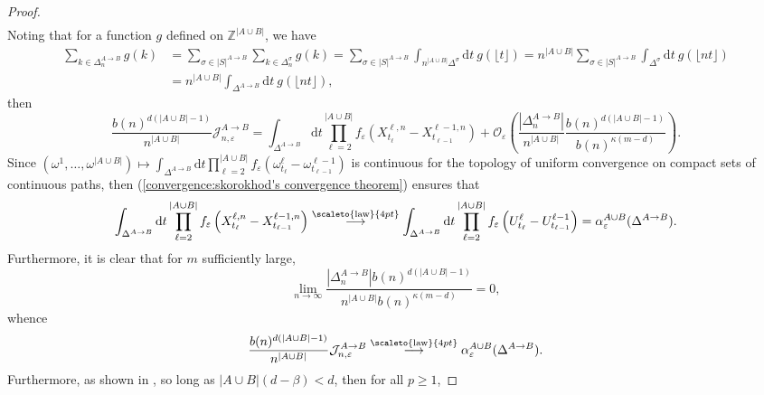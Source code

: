 \documentclass[12pt]{article}
\newcommand{\1}{\mathds{1}}
\newcommand{\ZZ}{\mathbb Z}
\renewcommand{\d}{\mathrm d}
\newcommand{\distribution}{\stackrel{\scaleto{\mathrm{law}}{4pt}}{\longrightarrow}}
\numberwithin{equation}{section}
\begin{document}
\begin{proof}
\begin{align*}
    \end{align*}
    Noting that for a function $g$ defined on $\ZZ^{|A\cup B|}$, we have 
    \begin{align*}
        \sum_{k\in\Delta_n^{A\rightarrow B}}g(k)&=\sum_{\sigma\in|S|^{A\rightarrow B}}\sum_{k\in\Delta_n^\sigma}g(k)=\sum_{\sigma\in|S|^{A\rightarrow B}}\int_{n^{|A\cup B|}\Delta^\sigma}\d t\ g(\lfloor t\rfloor)=n^{|A\cup B|}\sum_{\sigma\in|S|^{A\rightarrow B}}\int_{\Delta^\sigma}\d t\ g(\lfloor nt\rfloor)\\
        &=n^{|A\cup B|}\int_{\Delta^{A\rightarrow B}}\d t\ g(\lfloor nt\rfloor),
    \end{align*}
    then
    \begin{equation*}
        \frac{b(n)^{d(|A\cup B|-1)}}{n^{|A\cup B|}}\mathcal J_{n,\varepsilon}^{A\rightarrow B}=\int_{\Delta^{A\rightarrow B}}\d t\prod_{\ell=2}^{|A\cup B|}f_\varepsilon\left(X_{t_\ell}^{\ell,n}-X_{t_{\ell-1}}^{\ell-1,n}\right)+\mathcal O_\varepsilon\left(\frac{|\Delta_n^{A\rightarrow B}|}{n^{|A\cup B|}}\frac{b(n)^{d(|A\cup B|-1)}}{b(n)^{\kappa(m-d)}}\right).
    \end{equation*}
    Since $(\omega^1,\dots,\omega^{|A\cup B|})\mapsto\int_{\Delta^{A\rightarrow B}}\d t\prod_{\ell=2}^{|A\cup B|}f_\varepsilon\left(\omega_{t_\ell}^\ell-\omega_{t_{\ell-1}}^{\ell-1}\right)$ is continuous for the topology of uniform convergence on compact sets of continuous paths, then (\ref{convergence:skorokhod's convergence theorem}) ensures that 
    \begin{equation*}
        \int_{\Delta^{A\rightarrow B}}\d t\prod_{\ell=2}^{|A\cup B|}f_\varepsilon\left(X_{t_\ell}^{\ell,n}-X_{t_{\ell-1}}^{\ell-1,n}\right)\distribution\int_{\Delta^{A\rightarrow B}}\d t\prod_{\ell=2}^{|A\cup B|}f_\varepsilon\left(U_{t_\ell}^\ell-U_{t_{\ell-1}}^{\ell-1}\right)=\alpha_\varepsilon^{A\cup B}(\Delta^{A\rightarrow B}).
    \end{equation*}
    Furthermore, it is clear that for $m$ sufficiently large, 
    \begin{equation*}
        \underset{n\rightarrow \infty}\lim\frac{|\Delta_n^{A\rightarrow B}|b(n)^{d(|A\cup B|-1)}}{n^{|A\cup B|}b(n)^{\kappa(m-d)}}=0,
    \end{equation*}
    whence 
    \begin{equation*}
        \frac{b(n)^{d(|A\cup B|-1)}}{n^{|A\cup B|}}\mathcal J_{n,\varepsilon}^{A\rightarrow B}\distribution\alpha_\varepsilon^{A\cup B}(\Delta^{A\rightarrow B}).
    \end{equation*}
    Furthermore, as shown in \cite{ChenRosen2005}, so long as $|A\cup B|(d-\beta)<d$, then for all $p\ge1$,

\end{proof}
\end{document}
